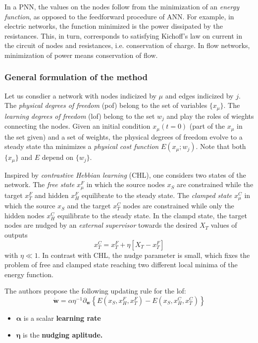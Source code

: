 \documentclass[10.5pt]{article}
\begin{document}
In a PNN, the values on the nodes follow from the minimization of an \textit{energy function}, as opposed to the feedforward procedure of ANN. For example, in electric networks, the function minimized is the power dissipated by the resistances. This, in turn, corresponds to satisfying Kichoff's law on current in the circuit of nodes and resistances, i.e. conservation of charge. In flow networks, minimization of power means conservation of flow.

\subsubsection{General formulation of the method}

Let us consdier a network with nodes indicized by $\mu$ and edges indicized by $j$. The \textit{physical degrees of freedom} (pof) belong to the set of variables $\{ x_{\mu}\}$. The \textit{learning degrees of freedom} (lof) belong to the set $w_j$ and play the roles of wieghts connecting the nodes. Given an initial condition $x_{\mu}(t=0)$ (part of the $x_{\mu}$ in the set given) and a set of weights, the physical degrees of freedom evolve to a steady state tha minimizes a \textit{physical cost function} $E(x_{\mu};w_j)$. Note that both $\{ x_{\mu} \}$ and $E$ depend on $\{ w_j\}$.

Inspired by \textit{contrastive Hebbian learning} (CHL), one considers two states of the network. The \textit{free state} $x_{\mu}^{F}$ in which the source nodes $x_S$ are constrained while the target $x_T^F$ and hidden $x_H^F$ equilibrate to the steady state. The \textit{clamped state} $x_{\mu}^{C}$ in which the source $x_S$ and the target $x_T^C$ nodes are constrained while only the hidden nodes $x_H^C$ equilibrate to the steady state. In the clampd state, the target nodes are nudged by an \textit{external supervisor} towards the desired $X_T$ values of outputs
\[
x_T^{C} = x_{T}^F + \eta \left[ X_T - x_{T}^{F} \right] 
\] 
with $\eta \ll 1$. In contrast with CHL, the nudge parameter is small, which fixes the problem of free and clamped state reaching two different local minima of the energy function.

The authors propose the following updating rule for the lof:
\[
\dot{\mathbf{w}} = \alpha \eta^{-1} \partial_{\mathbf{w}} \left\{ E(x_S, x_{H}^{F}, x_{T}^{F}) - E(x_S, x_{H}^{C}, x_{T}^{C}) \right\}   
\]

\begin{itemize}
    \item $\boldsymbol{\alpha}$ is a scalar \bf{learning rate}
    \item $\boldsymbol{\eta}$ is the \bf{nudging aplitude}.
\end{itemize}
\end{document}
